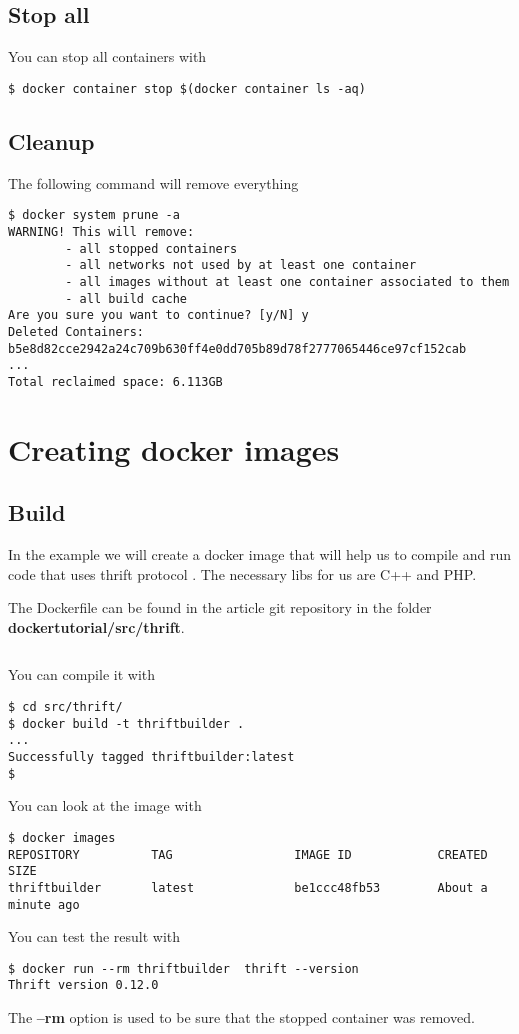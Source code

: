 \documentclass[14pt,a4paper]{article}
\begin{document}
\subsection{Stop all}
You can stop all containers with
\begin{verbatim}
$ docker container stop $(docker container ls -aq)
\end{verbatim}

\subsection{Cleanup}
The following command will remove everything
\begin{verbatim}
$ docker system prune -a
WARNING! This will remove:
        - all stopped containers
        - all networks not used by at least one container
        - all images without at least one container associated to them
        - all build cache
Are you sure you want to continue? [y/N] y
Deleted Containers:
b5e8d82cce2942a24c709b630ff4e0dd705b89d78f2777065446ce97cf152cab
...
Total reclaimed space: 6.113GB
\end{verbatim}

\section{Creating docker images}

\subsection{Build}
In the example we will create a docker image that will help us to
compile and run code that uses thrift protocol \cite{apache:thrift}.
The necessary libs for us are C++ and PHP. 

The Dockerfile can be found in the article git
repository \cite{github:articles_ivanmurashko} in the folder 
\textbf{dockertutorial/src/thrift}.
\inputminted{shell}{./src/thrift/Dockerfile}
You can compile it with 
\begin{verbatim}
$ cd src/thrift/
$ docker build -t thriftbuilder .
...
Successfully tagged thriftbuilder:latest
$
\end{verbatim}
You can look at the image with 
\begin{verbatim}
$ docker images
REPOSITORY          TAG                 IMAGE ID            CREATED              SIZE
thriftbuilder       latest              be1ccc48fb53        About a
minute ago
\end{verbatim}
You can test the result with
\begin{verbatim}
$ docker run --rm thriftbuilder  thrift --version
Thrift version 0.12.0
\end{verbatim}
The \textbf{--rm} option is used to be sure that the stopped container
was removed.  
\end{document}
